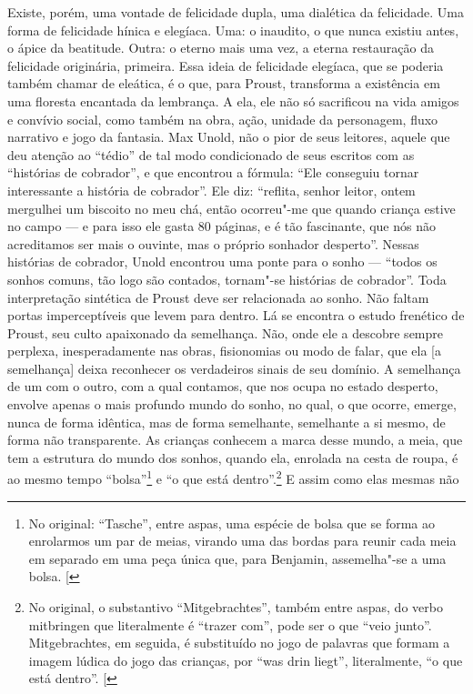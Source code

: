 Existe, porém, uma vontade de felicidade dupla, uma dialética da
felicidade. Uma forma de felicidade hínica e elegíaca. Uma: o inaudito,
o que nunca existiu antes, o ápice da beatitude. Outra: o eterno mais
uma vez, a eterna restauração da felicidade originária, primeira. Essa
ideia de felicidade elegíaca, que se poderia também chamar de eleática,
é o que, para Proust, transforma a existência em uma floresta encantada
da lembrança. A ela, ele não só sacrificou na vida amigos e convívio
social, como também na obra, ação, unidade da personagem, fluxo
narrativo e jogo da fantasia. Max Unold, não o pior de seus leitores,
aquele que deu atenção ao ``tédio'' de tal modo condicionado de seus
escritos com as ``histórias de cobrador'', e que encontrou a fórmula:
``Ele conseguiu tornar interessante a história de cobrador''. Ele diz:
``reflita, senhor leitor, ontem mergulhei um biscoito no meu chá, então
ocorreu"-me que quando criança estive no campo --- e para isso ele gasta 80
páginas, e é tão fascinante, que nós não acreditamos ser mais o ouvinte,
mas o próprio sonhador desperto''. Nessas histórias de cobrador, Unold
encontrou uma ponte para o sonho --- ``todos os sonhos comuns, tão logo
são contados, tornam"-se histórias de cobrador''. Toda interpretação
sintética de Proust deve ser relacionada ao sonho. Não faltam portas
imperceptíveis que levem para dentro. Lá se encontra o estudo frenético
de Proust, seu culto apaixonado da semelhança. Não, onde ele a descobre
sempre perplexa, inesperadamente nas obras, fisionomias ou modo de
falar, que ela {[}a semelhança{]} deixa reconhecer os verdadeiros sinais
de seu domínio. A semelhança de um com o outro, com a qual contamos, que
nos ocupa no estado desperto, envolve apenas o mais profundo mundo do
sonho, no qual, o que ocorre, emerge, nunca de forma idêntica, mas de
forma semelhante, semelhante a si mesmo, de forma não transparente. As
crianças conhecem a marca desse mundo, a meia, que tem a estrutura do
mundo dos sonhos, quando ela, enrolada na cesta de roupa, é ao mesmo
tempo ``bolsa''\footnote{No original: ``Tasche'', entre aspas, uma espécie de bolsa que se forma ao enrolarmos um par de meias, virando uma das bordas para reunir cada meia em separado em uma peça única que, para Benjamin, assemelha"-se a uma bolsa. {[}\versal{N. T.}{]}} e ``o que está dentro''.\footnote{No original, o substantivo ``Mitgebrachtes'', também entre aspas, do verbo mitbringen que literalmente é ``trazer com'', pode ser o que ``veio junto''. Mitgebrachtes, em seguida, é substituído no jogo de palavras que formam a imagem lúdica do jogo das crianças, por ``was drin liegt'', literalmente, ``o que está dentro''. {[}\versal{N. T.}{]}} E assim como elas mesmas não
